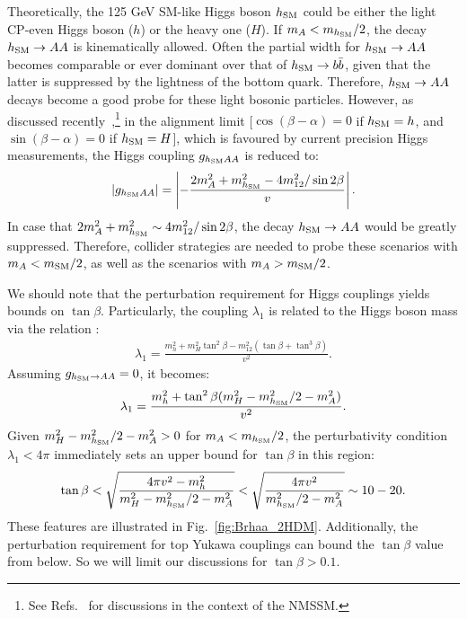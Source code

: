 \documentclass[preprintnumbers,superscriptaddress,nofootinbib,aps,prd,floatfix]{revtex4}
\begin{document}
Theoretically, the 125 GeV SM-like Higgs boson $h_{\rm SM}$ could be either the light CP-even Higgs boson ($h$) or the heavy one ($H$). If $m_A < m_{h_{\rm SM}}/2$, the decay $h_{\rm SM}\to AA$ is kinematically allowed. Often the partial width for $h_{\rm SM}\to AA$ becomes comparable or ever dominant over that of $h_{\rm SM}\to b\bar{b}$, given that the latter is suppressed by the lightness of the bottom quark.  Therefore, $h_{\rm SM} \to AA$ decays become a good probe for these light bosonic particles. However, as discussed recently~\cite{Bernon:2014nxa},\footnote{See Refs.~\cite{Draper:2010ew,Huang:2014cla} for discussions in the context of the NMSSM.} in the alignment limit [$\cos(\beta -\alpha)=0$ if $h_{\rm SM}=h$, and $\sin(\beta -\alpha)=0$ if $h_{\rm SM}=H$], which is favoured by current precision Higgs measurements, the Higgs coupling $g_{h_{\rm SM} AA}$ is reduced to: 
\begin{eqnarray}
\left|g_{h_{\rm SM} AA}\right | = \left |-\frac{2 m_A^2 + m_{h_{\rm SM}}^2  - 4 m_{12}^2/\sin 2\beta }{v}\right |.
\end{eqnarray}
In case that  $2 m_A^2 + m_{h_{\rm SM}}^2  \sim 4 m_{12}^2/\sin 2\beta$, the decay $h_{\rm SM}\to AA$ would be greatly suppressed. Therefore, collider strategies  are needed to probe these scenarios with $m_A < m_{\rm SM}/2$, as well as the scenarios with $m_A > m_{\rm SM}/2$.

We should note that the perturbation requirement for Higgs couplings yields bounds on $\tan\beta$. Particularly, the coupling $\lambda_1$ is related to the Higgs boson mass via the relation \cite{Bernon:2014nxa}: 
\begin{eqnarray}
\lambda_1 = \frac{m_h^2 + m_H^2 \tan^2\beta -  m_{12}^2 (\tan\beta +\tan^3 \beta)}{v^2}.
\end{eqnarray}
Assuming $g_{h_{\rm SM}\to AA}=0$, it becomes: 
\begin{eqnarray}
\lambda_1 = \frac{m_h^2 + \tan^2\beta (m_H^2 - m_{h_{\rm SM}}^2/2 - m_A^2)  }{v^2}.
\end{eqnarray}
Given $m_H^2 - m_{h_{\rm SM}}^2/2 - m_A^2 > 0$ for $m_A < m_{h_{\rm SM}}/2$, the perturbativity condition $\lambda_1 < 4\pi$ immediately sets an upper bound for $\tan\beta$ in this region:
\begin{eqnarray}
\tan\beta < \sqrt {\frac{4 \pi v^2 - m_h^2}{m_H^2 - m_{h_{\rm SM}}^2/2 - m_A^2 }} <  \sqrt {\frac{4 \pi v^2 }{m_{h_{\rm SM}}^2/2 - m_A^2 }}  \sim 10-20.
\end{eqnarray} 
These features are illustrated in Fig.~\ref{fig:Brhaa_2HDM}.  Additionally, the perturbation requirement for top Yukawa couplings can bound the $\tan\beta$ value from below. So we will limit our discussions for $\tan\beta > 0.1$. 
\end{document}
